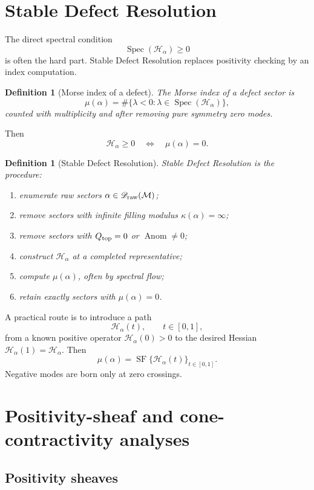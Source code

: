 \documentclass[11pt]{article}
\newtheorem{definition}[theorem]{Definition}
\DeclareMathOperator{\Spec}{Spec}
\DeclareMathOperator{\Anom}{Anom}
\DeclareMathOperator{\SF}{SF}
\newcommand{\Hess}{\mathcal H}
\newcommand{\M}{\mathcal M}
\begin{document}
\section{Stable Defect Resolution}

The direct spectral condition
\[
        \Spec(\Hess_\alpha)\ge0
\]
is often the hard part. Stable Defect Resolution replaces positivity checking by an index computation.

\begin{definition}[Morse index of a defect]
The Morse index of a defect sector is
\[
\boxed{
        \mu(\alpha)=\#\{\lambda<0:\lambda\in\Spec(\Hess_\alpha)\},
}
\]
counted with multiplicity and after removing pure symmetry zero modes.
\end{definition}

Then
\[
        \Hess_\alpha\ge0\quad\Longleftrightarrow\quad \mu(\alpha)=0.
\]

\begin{definition}[Stable Defect Resolution]
Stable Defect Resolution is the procedure:
\begin{enumerate}[leftmargin=*]
    \item enumerate raw sectors $\alpha\in\mathscr D_{\rm raw}(\M)$;
    \item remove sectors with infinite filling modulus $\kappa(\alpha)=\infty$;
    \item remove sectors with $Q_{\rm top}=0$ or $\Anom\ne0$;
    \item construct $\Hess_\alpha$ at a completed representative;
    \item compute $\mu(\alpha)$, often by spectral flow;
    \item retain exactly sectors with $\mu(\alpha)=0$.
\end{enumerate}
\end{definition}

A practical route is to introduce a path
\[
        \Hess_\alpha(t),\qquad t\in[0,1],
\]
from a known positive operator $\Hess_\alpha(0)>0$ to the desired Hessian $\Hess_\alpha(1)=\Hess_\alpha$. Then
\[
\boxed{
        \mu(\alpha)=\SF\{\Hess_\alpha(t)\}_{t\in[0,1]}.
}
\]
Negative modes are born only at zero crossings.

\section{Positivity-sheaf and cone-contractivity analyses}

\subsection{Positivity sheaves}
\end{document}

